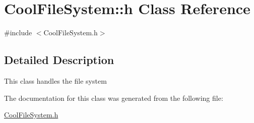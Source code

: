\hypertarget{class_cool_file_system_1_1h}{}\section{Cool\+File\+System\+:\+:h Class Reference}
\label{class_cool_file_system_1_1h}


{\ttfamily \#include $<$Cool\+File\+System.\+h$>$}



\subsection{Detailed Description}
This class handles the file system 

The documentation for this class was generated from the following file\+:\begin{DoxyCompactItemize}
\item 
\hyperlink{_cool_file_system_8h}{Cool\+File\+System.\+h}\end{DoxyCompactItemize}
